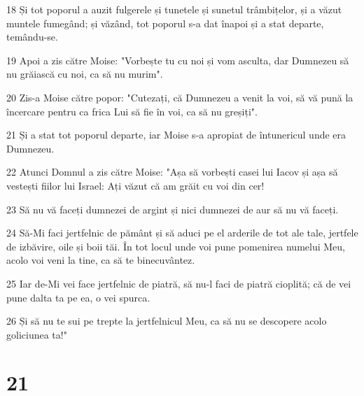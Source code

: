 \par 18 Și tot poporul a auzit fulgerele și tunetele și sunetul trâmbițelor, și a văzut muntele fumegând; și văzând, tot poporul s-a dat înapoi și a stat departe, temându-se.
\par 19 Apoi a zis către Moise: "Vorbește tu cu noi și vom asculta, dar Dumnezeu să nu grăiască cu noi, ca să nu murim".
\par 20 Zis-a Moise către popor: "Cutezați, că Dumnezeu a venit la voi, să vă pună la încercare pentru ca frica Lui să fie în voi, ca să nu greșiți".
\par 21 Și a stat tot poporul departe, iar Moise s-a apropiat de întunericul unde era Dumnezeu.
\par 22 Atunci Domnul a zis către Moise: "Așa să vorbești casei lui Iacov și așa să vestești fiilor lui Israel: Ați văzut că am grăit cu voi din cer!
\par 23 Să nu vă faceți dumnezei de argint și nici dumnezei de aur să nu vă faceți.
\par 24 Să-Mi faci jertfelnic de pământ și să aduci pe el arderile de tot ale tale, jertfele de izbăvire, oile și boii tăi. În tot locul unde voi pune pomenirea numelui Meu, acolo voi veni la tine, ca să te binecuvântez.
\par 25 Iar de-Mi vei face jertfelnic de piatră, să nu-l faci de piatră cioplită; că de vei pune dalta ta pe ea, o vei spurca.
\par 26 Și să nu te sui pe trepte la jertfelnicul Meu, ca să nu se descopere acolo goliciunea ta!"

\chapter{21}

